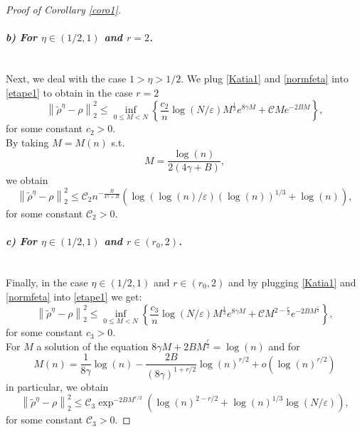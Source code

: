 \documentclass[a4paper]{amsart}
\begin{document}
\begin{proof}[Proof of Corollary \ref{coro1}]
\paragraph{\textit{b) For $\eta\in(1/2,1)$ and $r=2$.}}
\noindent\\


%
Next, we deal with the case $1>\eta>1/2$. We plug \eqref{Katia1} and
\eqref{normfeta} into \eqref{etape1} to obtain in the case $r=2$
              \begin{equation*}
                        \left\|\tilde{\rho}^\eta  - \rho \right\|^{2}_{2}
\leq\inf_{0\leq M <N }\left\{ \frac{c_{2}}{n}  \log\left(N/
                        \varepsilon\right)M^{\frac{1}{3}} e^{8 \gamma M}+
\mathcal{C}M  e^{-2BM}\right\},
               \end{equation*}
for some constant $c_2>0$.\\
By taking $M=M(n)$ s.t.
$$ 
M=\frac{\log(n)}{2(4\gamma+B)} ,%
$$
we obtain
$$
 \left\|\tilde{\rho}^\eta - \rho \right\|^{2}_{2}  \leq\mathcal{C}_2  
n^{-\frac{B}{4\gamma+B}}\left(\log\left( \log (n)/\varepsilon\right)
\left(\log(n)\right)^{1/3}+\log(n) \right) ,
$$
for some constant $\mathcal{C}_2 >0$. 
\noindent\\ 

\paragraph{\textit{c) For $\eta\in(1/2,1)$ and $r\in(r_0,2)$.}}
\noindent\\
Finally, in the case $\eta\in(1/2,1)$ and $r\in(r_0,2)$ and by plugging 
\eqref{Katia1} and \eqref{normfeta} into \eqref{etape1} we get:
              \begin{equation*}
                        \left\|\tilde{\rho}^\eta  - \rho \right\|^{2}_{2}
\leq\inf_{0\leq M <N }\left\{ \frac{c_3}{n}\log\left(N
                        /\varepsilon\right) M^{\frac{1}{3}} e^{8 \gamma M}+
\mathcal{C} M^{2-\frac{r}{2}}  e^{-2BM^{\frac{r}{2}}}\right\},
               \end{equation*}
%
for some constant $c_3>0$.\\
For $M$ a solution of the equation $8\gamma M +2 B M^{\frac{r}{2}} = \log(n)$
and for 
$$ M(n)= \frac{1}{8\gamma} \log(n) - \frac{2B}{(8\gamma)^{1+r/2}} \log(n)^{r/2}
+ o(\log(n)^{r/2})$$
in particular, we obtain 
$$
 \left\|\tilde{\rho}^\eta - \rho \right\|^{2}_{2}  \leq\mathcal{C}_3  
\exp^{-2BM^{r/2}} \left( \log(n)^{2-r/2} +
 \log(n)^{1/3}\log\left(N/\varepsilon\right) \right),
$$
for some constant $\mathcal{C}_3 >0$. 
\end{proof}
\end{document}
